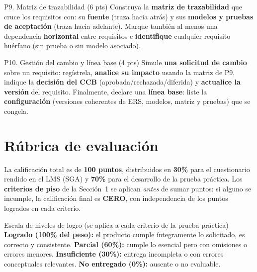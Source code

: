 \documentclass[11pt,a4paper,oneside]{article}
\begin{document}
\begin{tarea}{P9. Matriz de trazabilidad \hfill (6 pts)}
Construya la \textbf{matriz de trazabilidad} que cruce los requisitos con: su \textbf{fuente} (traza hacia atr\'as) y sus \textbf{modelos y pruebas de aceptaci\'on} (traza hacia adelante). Marque tambi\'en al menos una dependencia \textbf{horizontal} entre requisitos e \textbf{identifique} cualquier requisito hu\'erfano (sin prueba o sin modelo asociado).
\end{tarea}

\begin{tarea}{P10. Gesti\'on del cambio y l\'inea base \hfill (4 pts)}
Simule \textbf{una solicitud de cambio} sobre un requisito: reg\'istrela, \textbf{analice su impacto} usando la matriz de P9, indique la \textbf{decisi\'on del CCB} (aprobada/rechazada/diferida) y \textbf{actualice la versi\'on} del requisito. Finalmente, declare una \textbf{l\'inea base}: liste la \textbf{configuraci\'on} (versiones coherentes de ERS, modelos, matriz y pruebas) que se congela.
\end{tarea}

\section{Rúbrica de evaluaci\'on}

La calificaci\'on total es de \textbf{100 puntos}, distribuidos en \textbf{30\%} para el cuestionario rendido en el LMS (SGA) y \textbf{70\%} para el desarrollo de la prueba pr\'actica. Los \textbf{criterios de piso} de la Secci\'on~1 se aplican \emph{antes} de sumar puntos: si alguno se incumple, la calificaci\'on final es \textbf{CERO}, con independencia de los puntos logrados en cada criterio.

\begin{concepto}{Escala de niveles de logro (se aplica a cada criterio de la prueba pr\'actica)}
\textbf{Logrado (100\% del peso):} el producto cumple \'integramente lo solicitado, es correcto y consistente. \quad \textbf{Parcial (60\%):} cumple lo esencial pero con omisiones o errores menores. \quad \textbf{Insuficiente (30\%):} entrega incompleta o con errores conceptuales relevantes. \quad \textbf{No entregado (0\%):} ausente o no evaluable.
\end{concepto}
\end{document}
